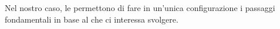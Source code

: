 	Nel nostro caso, le  permettono di fare in un'unica configurazione i passaggi fondamentali in base al  che ci interessa svolgere. 








